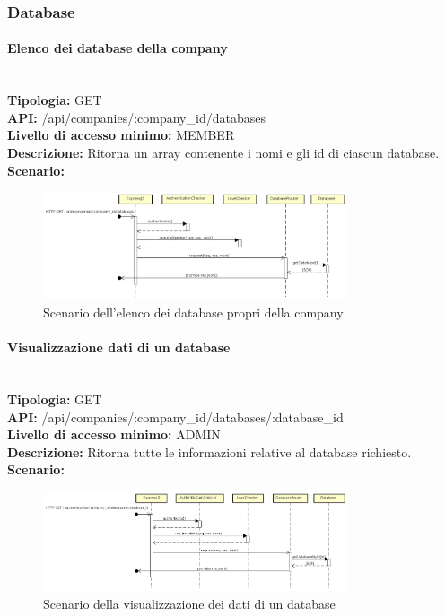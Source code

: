 \newpage
\subsubsection{Database}
\paragraph{Elenco dei database della company}\mbox{}\\
\textbf{Tipologia:} GET \\
\textbf{API:} /api/companies/:company\_id/databases \\
\textbf{Livello di accesso minimo:} MEMBER \\
\textbf{Descrizione:} Ritorna un array contenente i nomi e gli id di ciascun database. \\
\textbf{Scenario:}
\begin{figure}[H]
\centering
\includegraphics[width=0.8\textwidth]{res/sections/backend/sequence/(GET)database.png}
\caption{Scenario dell'elenco dei database propri della company}
\end{figure}

\newpage
\paragraph{Visualizzazione dati di un database}\mbox{}\\
\textbf{Tipologia:} GET \\
\textbf{API:} /api/companies/:company\_id/databases/:database\_id \\
\textbf{Livello di accesso minimo:} ADMIN \\
\textbf{Descrizione:} Ritorna tutte le informazioni relative al database richiesto. \\
\textbf{Scenario:} 
\begin{figure}[H]
\centering
\includegraphics[width=0.8\textwidth]{res/sections/backend/sequence/(GET)databaseById.png}
\caption{Scenario della visualizzazione dei dati di un database}
\end{figure}

